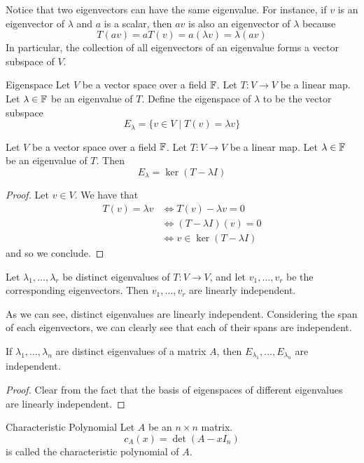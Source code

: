 \documentclass[a4paper]{article}
\begin{document}
Notice that two eigenvectors can have the same eigenvalue. For instance, if $v$ is an eigenvector of $\lambda$ and $a$ is a scalar, then $av$ is also an eigenvector of $\lambda$ because $$T(av)=aT(v)=a(\lambda v)=\lambda(av)$$ In particular, the collection of all eigenvectors of an eigenvalue forms a vector subspace of $V$. 

\begin{defn}{Eigenspace}{} Let $V$ be a vector space over a field $\mathbb{F}$. Let $T:V\to V$ be a linear map. Let $\lambda\in\mathbb{F}$ be an eigenvalue of $T$. Define the eigenspace of $\lambda$ to be the vector subspace $$E_\lambda=\{v\in V\;|\;T(v)=\lambda v\}$$
\end{defn}

\begin{lmm}{}{} Let $V$ be a vector space over a field $\mathbb{F}$. Let $T:V\to V$ be a linear map. Let $\lambda\in\mathbb{F}$ be an eigenvalue of $T$. Then $$E_\lambda=\ker(T-\lambda I)$$ 
\begin{proof}
Let $v\in V$. We have that 
\begin{align*}
T(v)=\lambda v&\iff T(v)-\lambda v=0\\
&\iff (T-\lambda I)(v)=0\\
&\iff v\in\ker(T-\lambda I)
\end{align*}
and so we conclude. 
\end{proof}
\end{lmm}

\begin{prp}{}{} Let $\lambda_1,\dots,\lambda_r$ be distinct eigenvalues of $T:V\to V$, and let $v_1,\dots,v_r$ be the corresponding eigenvectors. Then $v_1,\dots,v_r$ are linearly independent. 
\end{prp}

As we can see, distinct eigenvalues are linearly independent. Considering the span of each eigenvectors, we can clearly see that each of their spans are independent. 

\begin{prp}{}{} If $\lambda_1,\dots,\lambda_n$ are distinct eigenvalues of a matrix $A$, then $E_{\lambda_1},\dots,E_{\lambda_n}$ are independent. 
\begin{proof}
Clear from the fact that the basis of eigenspaces of different eigenvalues are linearly independent. 
\end{proof}
\end{prp}

\begin{defn}{Characteristic Polynomial}{} Let $A$ be an $n\times n$ matrix. $$c_A(x)=\det(A-xI_n)$$ is called the characteristic polynomial of $A$. 
\end{defn}
\end{document}
